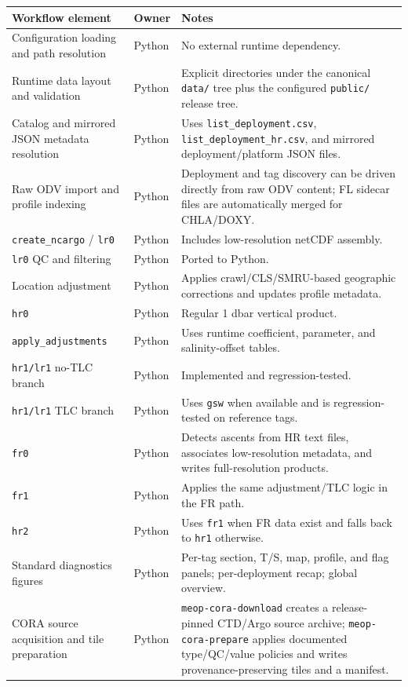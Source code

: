 \documentclass[11pt,a4paper]{article}
\newcommand{\pkg}[1]{\texttt{#1}}
\begin{document}
\begin{longtable}{>{\raggedright\arraybackslash}p{} >{\raggedright\arraybackslash}p{} >{\raggedright\arraybackslash}p{}}
\toprule
\textbf{Workflow element} & \textbf{Owner} & \textbf{Notes} \\
\midrule
\endhead
Configuration loading and path resolution & Python & No external runtime dependency. \\
Runtime data layout and validation & Python & Explicit directories under the canonical \pkg{data/} tree plus the configured \pkg{public/} release tree. \\
Catalog and mirrored JSON metadata resolution & Python & Uses \pkg{list\_deployment.csv}, \pkg{list\_deployment\_hr.csv}, and mirrored deployment/platform JSON files. \\
Raw ODV import and profile indexing & Python & Deployment and tag discovery can be driven directly from raw ODV content; FL sidecar files are automatically merged for CHLA/DOXY. \\
\pkg{create\_ncargo} / \pkg{lr0} & Python & Includes low-resolution netCDF assembly. \\
\pkg{lr0} QC and filtering & Python & Ported to Python. \\
Location adjustment & Python & Applies crawl/CLS/SMRU-based geographic corrections and updates profile metadata. \\
\pkg{hr0} & Python & Regular 1 dbar vertical product. \\
\pkg{apply\_adjustments} & Python & Uses runtime coefficient, parameter, and salinity-offset tables. \\
\pkg{hr1/lr1} no-TLC branch & Python & Implemented and regression-tested. \\
\pkg{hr1/lr1} TLC branch & Python & Uses \pkg{gsw} when available and is regression-tested on reference tags. \\
\pkg{fr0} & Python & Detects ascents from HR text files, associates low-resolution metadata, and writes full-resolution products. \\
\pkg{fr1} & Python & Applies the same adjustment/TLC logic in the FR path. \\
\pkg{hr2} & Python & Uses \pkg{fr1} when FR data exist and falls back to \pkg{hr1} otherwise. \\
Standard diagnostics figures & Python & Per-tag section, T/S, map, profile, and flag panels; per-deployment recap; global overview. \\
CORA source acquisition and tile preparation & Python & \pkg{meop-cora-download} creates a release-pinned CTD/Argo source archive; \pkg{meop-cora-prepare} applies documented type/QC/value policies and writes provenance-preserving tiles and a manifest. \\

\end{longtable}
\end{document}
